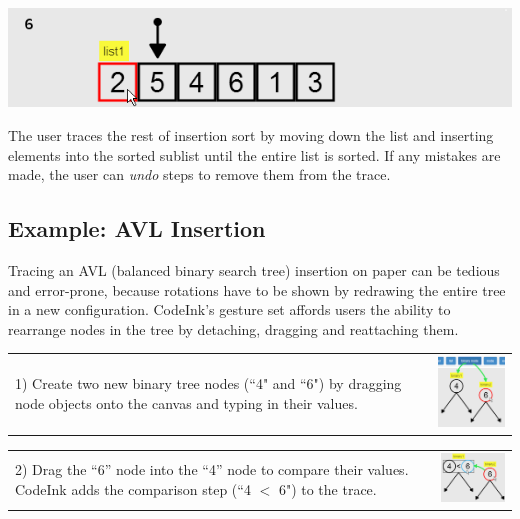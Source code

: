 \noindent \includegraphics[width=0.7\columnwidth]{img/examples/insertion-6.png}

The user traces the rest of insertion sort by moving down the list and inserting
elements into the sorted sublist until the entire list is sorted.
If any mistakes are made, the user can \emph{undo} steps to remove them from the
trace.

\subsection{Example: AVL Insertion}
Tracing an AVL (balanced binary search tree) insertion on paper can be tedious
and error-prone, because rotations have to be shown by redrawing the entire tree
in a new configuration. CodeInk's gesture set affords users the ability to
rearrange nodes in the tree by detaching, dragging and reattaching them.

\noindent \begin{tabular}{m{4.6cm} m{3.4cm}}

1) Create two new binary tree nodes (``4" and ``6") by dragging node
objects onto the canvas and typing in their values.

& \includegraphics[width=3.4cm]{img/examples/bst-1.png}
\end{tabular}


\noindent \begin{tabular}{m{4.6cm} m{3.4cm}}

2) Drag the ``6'' node into the ``4'' node to compare their values.
CodeInk adds the comparison step (``4 $<$ 6") to the trace.

& \includegraphics[width=3.4cm]{img/examples/bst-2.png}
\end{tabular}

